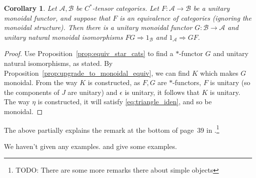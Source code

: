 \documentclass[a4paper,11pt]{article}
\theoremstyle{plain}
\newtheorem{corollary}[proposition]{Corollary}
\theoremstyle{remark}
\newcommand{\mc}[1]{\mathcal{#1}}
\begin{document}
\begin{corollary}
Let $\mc A,\mc B$ be $C^*$-tensor categories.  Let $F\colon \mc A \to \mc B$ be a unitary monoidal functor, and suppose that $F$ is an equivalence of categories (ignoring the monoidal structure).  Then there is a unitary monoidal functor $G\colon \mc B\to\mc A$ and unitary natural monoidal isomorphisms $FG\Rightarrow 1_{\mc B}$ and $1_{\mc A} \Rightarrow GF$.
\end{corollary}
\begin{proof}
Use Proposition~\ref{prop:equiv_star_cats} to find a $*$-functor $G$ and unitary natural isomorphisms, as stated.  By Proposition~\ref{prop:upgrade_to_monoidal_equiv}, we can find $K$ which makes $G$ monoidal.  From the way $K$ is constructed, as $F,G$ are $*$-functors, $F$ is unitary (so the components of $J$ are unitary) and $\epsilon$ is unitary, it follows that $K$ is unitary.  The way $\eta$ is constructed, it will satisfy \eqref{eq:triangle_iden}, and so be monoidal.
\end{proof}

The above partially explains the remark at the bottom of page~39 in \cite{NT_CQGsBook}.\footnote{TODO: There are some more remarks there about simple objects}

We haven't given any examples.  \cite[Example~2.1.7]{NT_CQGsBook} and \cite[Sections~2.5, 2.6]{EGNO_TensorCategories} give some examples.
\end{document}
